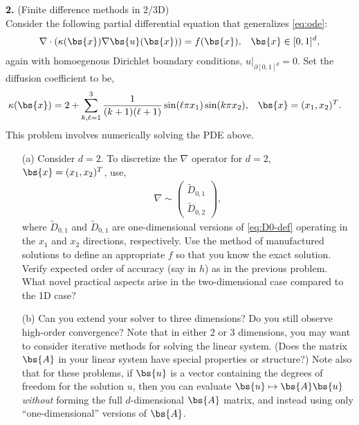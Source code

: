 \documentclass[11pt]{amsart}
\begin{document}
\textbf{2.} (Finite difference methods in 2/3D)\\
  Consider the following partial differential equation that generalizes \eqref{eq:ode}:
  \begin{align}\label{eq:laplace}
    \nabla \cdot \left(\kappa(\bs{x}) \nabla \bs{u}(\bs{x}) \right) &= f(\bs{x}), & \bs{x} \in [0,1]^d,
  \end{align}
  again with homoegenous Dirichlet boundary conditions, $u\big|_{\partial [0,1]^d} = 0$. Set the diffusion coefficient to be,
  \begin{align*}
    \kappa(\bs{x}) &= 2 + \sum_{k,\ell = 1}^3 \frac{1}{(k+1)(\ell+1)} \sin(\ell \pi x_1) \sin (k \pi x_2), & \bs{x} &= (x_1, x_2)^T.
  \end{align*}
  This problem involves numerically solving the PDE above.
  \begin{itemize}
    \item[(a)] Consider $d = 2$. To discretize the $\nabla$ operator for $d=2$, $\bs{x} = (x_1, x_2)^T$, use,
    \begin{align*}
      \nabla \sim \left(\begin{array}{c} \widetilde{D}_{0,1} \\ \widetilde{D}_{0,2} \end{array}\right),
    \end{align*}
      where $\widetilde{D}_{0,1}$ and $\widetilde{D}_{0,1}$ are one-dimensional versions of \eqref{eq:D0-def} operating in the $x_1$ and $x_2$ directions, respectively. Use the method of manufactured solutions to define an appropriate $f$ so that you know the exact solution. Verify expected order of accuracy (say in $h$) as in the previous problem. What novel practical aspects arise in the two-dimensional case compared to the 1D case?
    \item[(b)] Can you extend your solver to three dimensions? Do you still observe high-order convergence?  Note that in either 2 or 3 dimensions, you may want to consider iterative methods for solving the linear system. (Does the matrix $\bs{A}$ in your linear system have special properties or structure?) Note also that for these problems, if $\bs{u}$ is a vector containing the degrees of freedom for the solution $u$, then you can evaluate $\bs{u} \mapsto \bs{A} \bs{u}$ \textit{without} forming the full $d$-dimensional $\bs{A}$ matrix, and instead using only ``one-dimensional'' versions of $\bs{A}$.
  \end{itemize}
\end{document}
